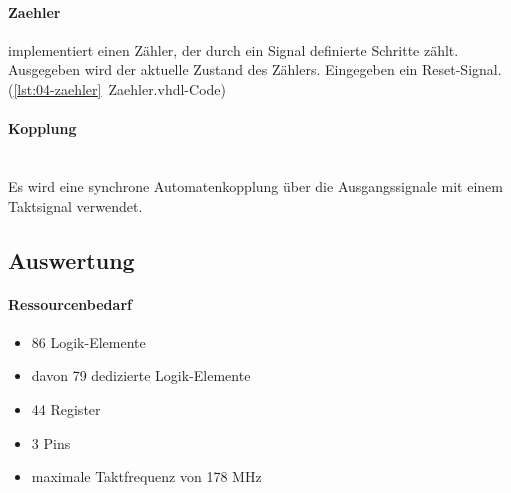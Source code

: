 	\paragraph{Zaehler} implementiert einen Zähler, der durch ein Signal definierte Schritte zählt. Ausgegeben wird der aktuelle Zustand des Zählers. Eingegeben ein Reset-Signal. (\ref{lst:04-zaehler}~Zaehler.vhdl-Code) 
	\paragraph{Kopplung} \hfill\\
	Es wird eine synchrone Automatenkopplung über die Ausgangssignale mit einem Taktsignal verwendet.


\subsection{Auswertung}
	\paragraph{Ressourcenbedarf}
	\begin{itemize} 
	\item 86 Logik-Elemente
	\item davon 79 dedizierte Logik-Elemente
	\item 44 Register
	\item 3 Pins 
	\item maximale Taktfrequenz von 178 MHz
	\end{itemize}

